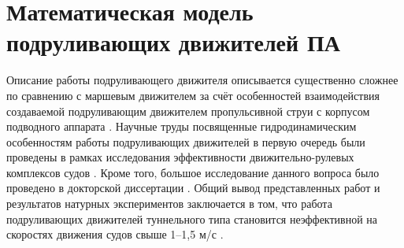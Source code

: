 

\section{Математическая модель подруливающих движителей ПА}
Описание работы подруливающего движителя описывается существенно сложнее по сравнению с маршевым движителем за счёт особенностей взаимодействия создаваемой подруливающим движителем пропульсивной струи с корпусом подводного аппарата \cite{tolstonogov2017auv}.
Научные труды посвященные гидродинамическим особенностям работы подруливающих движителей в первую очередь были проведены в рамках исследования эффективности движительно-рулевых комплексов судов \cite{chislett1966influence, english1964design, brix1973lateral}.
Кроме того, большое исследование данного вопроса было проведено в докторской диссертации \cite{nienhuis1992analysis}.
Общий вывод представленных работ и результатов натурных экспериментов заключается в том, что работа подруливающих движителей туннельного типа становится неэффективной на скоростях движения судов свыше 1–1,5 м/с \cite{english63}.

